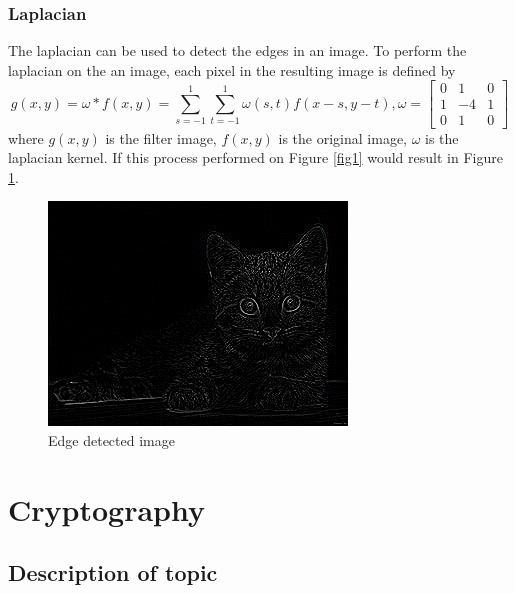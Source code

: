 \documentclass{../mathhomework}
\begin{document}
\subsubsection{Laplacian}

The laplacian can be used to detect the edges in an image. To perform the laplacian on the an image, each pixel in the resulting image is defined by
\begin{equation*}
    g(x,y) = \omega * f(x,y) = \sum^1_{s=-1} \sum^1_{t=-1} \omega(s,t) f(x - s, y - t), \omega = \begin{bmatrix}
        0 & 1 & 0 \\ 
        1 & -4 & 1 \\ 
        0 & 1 & 0
    \end{bmatrix}
\end{equation*}
where $g(x,y)$ is the filter image, $f(x,y)$ is the original image, $\omega$ is the laplacian kernel.
If this process performed on Figure \ref{fig1} would result in Figure \ref{fig5}.

\begin{figure}[H]
    \begin{center}
        \includegraphics{figures/laplacian.jpg}
    \end{center}

    \caption{Edge detected image}
    \label{fig5}
\end{figure}

\pagebreak

\section{Cryptography}

\subsection{Description of topic}
\end{document}
